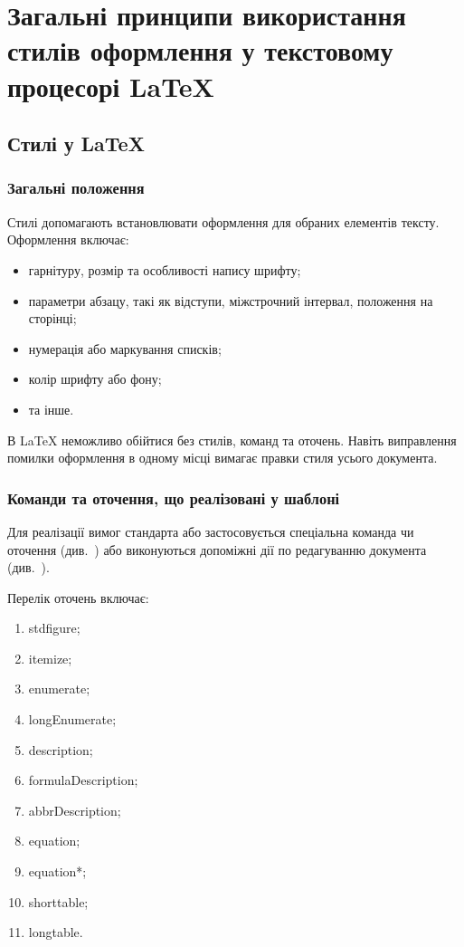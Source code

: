 \section{Загальні принципи використання стилів оформлення у текстовому процесорі \LaTeX{}}
\subsection{Стилі у \LaTeX{}}
\subsubsection{Загальні положення}

Стилі допомагають встановлювати оформлення для обраних елементів тексту. Оформлення включає:
\begin{itemize}
\item гарнітуру, розмір та особливості напису шрифту;
\item параметри абзацу, такі як відступи, міжстрочний інтервал, положення на сторінці;
\item нумерація або маркування списків;
\item колір шрифту або фону;
\item та інше.
\end{itemize}

В \LaTeX{} неможливо обійтися без стилів, команд та оточень. Навіть виправлення
помилки оформлення в одному місці вимагає правки стиля усього документа.

\subsubsection{Команди та оточення, що реалізовані у шаблоні}

Для реалізації вимог стандарта або застосовується спеціальна команда чи оточення
(див.~\label{sec:auto}) або виконуються допоміжні дії по редагуванню документа
(див.~\label{sec:manual}). 

Перелік оточень включає:
\begin{enumerate}
\item stdfigure;
\item itemize;
\item enumerate;
\item longEnumerate;
\item description;
\item formulaDescription;
\item abbrDescription;
\item equation;
\item equation*;
\item shorttable;
\item longtable.
\end{enumerate}


